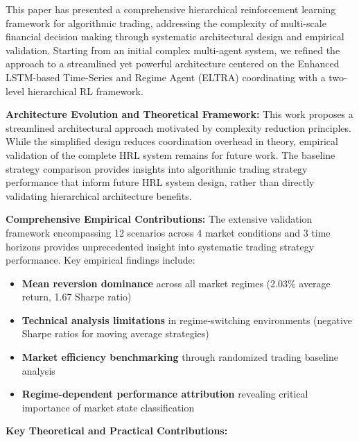 \documentclass[11pt,a4paper]{article}
\begin{document}
This paper has presented a comprehensive hierarchical reinforcement learning framework for algorithmic trading, addressing the complexity of multi-scale financial decision making through systematic architectural design and empirical validation. Starting from an initial complex multi-agent system, we refined the approach to a streamlined yet powerful architecture centered on the Enhanced LSTM-based Time-Series and Regime Agent (ELTRA) coordinating with a two-level hierarchical RL framework.

\textbf{Architecture Evolution and Theoretical Framework:}
This work proposes a streamlined architectural approach motivated by complexity reduction principles. While the simplified design reduces coordination overhead in theory, empirical validation of the complete HRL system remains for future work. The baseline strategy comparison provides insights into algorithmic trading strategy performance that inform future HRL system design, rather than directly validating hierarchical architecture benefits.

\textbf{Comprehensive Empirical Contributions:}
The extensive validation framework encompassing 12 scenarios across 4 market conditions and 3 time horizons provides unprecedented insight into systematic trading strategy performance. Key empirical findings include:

\begin{itemize}
\item \textbf{Mean reversion dominance} across all market regimes (2.03\% average return, 1.67 Sharpe ratio)
\item \textbf{Technical analysis limitations} in regime-switching environments (negative Sharpe ratios for moving average strategies)
\item \textbf{Market efficiency benchmarking} through randomized trading baseline analysis
\item \textbf{Regime-dependent performance attribution} revealing critical importance of market state classification

\end{itemize}
\textbf{Key Theoretical and Practical Contributions:}
\end{document}
